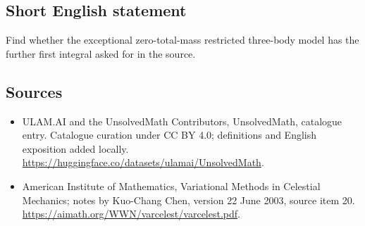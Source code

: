 \documentclass[11pt]{article}
\begin{document}
\subsection{Short English statement}
Find whether the exceptional zero-total-mass restricted three-body model has the further first integral asked for in the source.
\subsection{Sources}
\begin{itemize}
\item[\hypertarget{source:statement:1}{S1}] ULAM.AI and the UnsolvedMath Contributors, UnsolvedMath, catalogue entry. Catalogue curation under CC BY 4.0; definitions and English exposition added locally.
\url{https://huggingface.co/datasets/ulamai/UnsolvedMath}.
\item[\hypertarget{source:statement:2}{S2}] American Institute of Mathematics, Variational Methods in Celestial Mechanics; notes by Kuo-Chang Chen, version 22 June 2003, source item 20.
\url{https://aimath.org/WWN/varcelest/varcelest.pdf}.
\end{itemize}
\label{end:statement}
\end{document}
